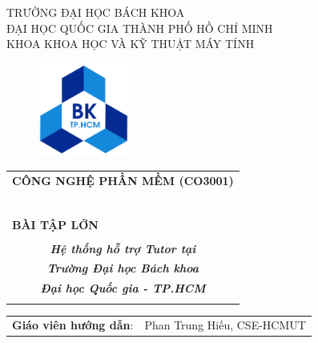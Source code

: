 \begin{titlepage}
\begin{center}
TRƯỜNG ĐẠI HỌC BÁCH KHOA \\
ĐẠI HỌC QUỐC GIA THÀNH PHỐ HỒ CHÍ MINH\\
KHOA KHOA HỌC VÀ KỸ THUẬT MÁY TÍNH
\end{center}


\begin{figure}[h!]
\begin{center}
\includegraphics[width=3cm]{Picture/hcmut.png}
\end{center}
\end{figure}



\begin{center}
\begin{tabular}{c}
\multicolumn{1}{l}{\textbf{{\Large CÔNG NGHỆ PHẦN MỀM (CO3001)}}}\\
~~\\
\hline
\\
\multicolumn{1}{l}{\textbf{{\Large BÀI TẬP LỚN}}}\\
\\
\textbf{\textit{{\Large Hệ thống hỗ trợ Tutor tại}}}\\
\textbf{\textit{{\Large Trường Đại học Bách khoa}}}\\
\textbf{\textit{{\Large Đại học Quốc gia - TP.HCM}}}\\

\\
\hline
\end{tabular}
\end{center}

\vspace{2cm}

\begin{table}[h]
    \begin{tabular}{rl}
    \hspace{1 cm}\textbf{Giáo viên hướng dẫn}:
    & Phan Trung Hiếu, CSE-HCMUT\\


\end{tabular}
\end{table}
\end{titlepage}
